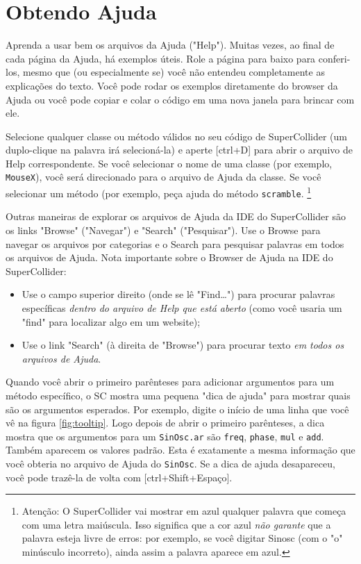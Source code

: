 \section{Obtendo Ajuda}

Aprenda a usar bem os arquivos da Ajuda ("Help"). Muitas vezes, ao final de cada página da Ajuda, há exemplos úteis.  Role a página para baixo para conferi-los, mesmo que (ou especialmente se) você não entendeu completamente as explicações do texto. Você pode rodar os exemplos diretamente do browser da Ajuda ou você pode copiar e colar o código em uma nova janela para brincar com ele. 

Selecione qualquer classe ou método válidos no seu código de SuperCollider (um duplo-clique na palavra irá selecioná-la) e aperte [ctrl+D] para abrir o arquivo de Help correspondente. Se você selecionar o nome de uma classe (por exemplo, \texttt{MouseX}), você será direcionado para o arquivo de Ajuda da classe. Se você selecionar um método (por exemplo, peça ajuda do método \texttt{scramble}. \footnote{Atenção: O SuperCollider vai mostrar em azul qualquer palavra que começa com uma letra maiúscula. Isso significa que a cor azul \emph{não garante} que a palavra esteja livre de erros: por exemplo, se você digitar Sinosc (com o "o" minúsculo incorreto), ainda assim a palavra aparece em azul.}

Outras maneiras de explorar os arquivos de Ajuda da IDE do SuperCollider são os links "Browse" ("Navegar") e "Search" ("Pesquisar"). Use o Browse para navegar os arquivos por categorias e o Search para pesquisar palavras em todos os arquivos de Ajuda.
Nota importante sobre o Browser de Ajuda na IDE do SuperCollider:

\begin{itemize}
\item Use o campo superior direito (onde se lê "Find…") para procurar palavras específicas \emph{dentro do arquivo de Help que está aberto} (como você usaria um "find" para localizar algo em um website);
\item Use o link "Search" (à direita de "Browse") para procurar texto \emph{em todos os arquivos de Ajuda}.
\end{itemize}

Quando você abrir o primeiro parênteses para adicionar argumentos para um método específico, o SC mostra uma pequena "dica de ajuda" para mostrar quais são os argumentos esperados. Por exemplo, digite o início de uma linha que você vê na figura \ref{fig:tooltip}. Logo depois de abrir o primeiro parênteses, a dica mostra que os argumentos para um \texttt{SinOsc.ar} são \texttt{freq}, \texttt{phase}, \texttt{mul} e \texttt{add}. Também aparecem os valores padrão. Esta é exatamente a mesma informação que você obteria no arquivo de Ajuda do \texttt{SinOsc}. Se a dica de ajuda desapareceu, você pode trazê-la de volta com [ctrl+Shift+Espaço].

